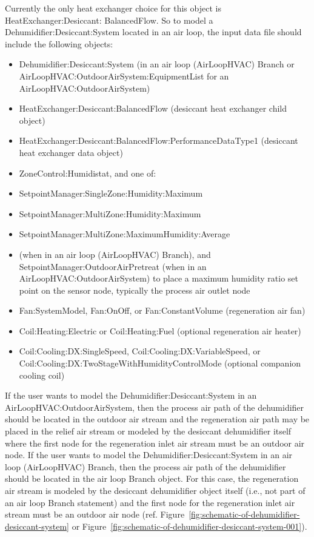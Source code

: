 Currently the only heat exchanger choice for this object is HeatExchanger:Desiccant: BalancedFlow. So to model a Dehumidifier:Desiccant:System located in an air loop, the input data file should include the following objects:

\begin{itemize}
\item
  Dehumidifier:Desiccant:System (in an air loop (AirLoopHVAC) Branch or AirLoopHVAC:OutdoorAirSystem:EquipmentList for an AirLoopHVAC:OutdoorAirSystem)
\item
  HeatExchanger:Desiccant:BalancedFlow (desiccant heat exchanger child object)
\item
  HeatExchanger:Desiccant:BalancedFlow:PerformanceDataType1 (desiccant heat exchanger data object)
\item
  ZoneControl:Humidistat, and one of:
\item
  SetpointManager:SingleZone:Humidity:Maximum
\item
  SetpointManager:MultiZone:Humidity:Maximum
\item
  SetpointManager:MultiZone:MaximumHumidity:Average
\item
  (when in an air loop (AirLoopHVAC) Branch), and SetpointManager:OutdoorAirPretreat (when in an AirLoopHVAC:OutdoorAirSystem) to place a maximum humidity ratio set point on the sensor node, typically the process air outlet node
\item
  Fan:SystemModel, Fan:OnOff, or Fan:ConstantVolume (regeneration air fan)
\item
  Coil:Heating:Electric or Coil:Heating:Fuel (optional regeneration air heater)
\item
  Coil:Cooling:DX:SingleSpeed, Coil:Cooling:DX:VariableSpeed, or Coil:Cooling:DX:TwoStageWithHumidityControlMode (optional companion cooling coil)
\end{itemize}

If the user wants to model the Dehumidifier:Desiccant:System in an AirLoopHVAC:OutdoorAirSystem, then the process air path of the dehumidifier should be located in the outdoor air stream and the regeneration air path may be placed in the relief air stream or modeled by the desiccant dehumidifier itself where the first node for the regeneration inlet air stream must be an outdoor air node. If the user wants to model the Dehumidifier:Desiccant:System in an air loop (AirLoopHVAC) Branch, then the process air path of the dehumidifier should be located in the air loop Branch object. For this case, the regeneration air stream is modeled by the desiccant dehumidifier object itself (i.e., not part of an air loop Branch statement) and the first node for the regeneration inlet air stream must be an outdoor air node (ref. Figure~\ref{fig:schematic-of-dehumidifier-desiccant-system} or Figure~\ref{fig:schematic-of-dehumidifier-desiccant-system-001}).


